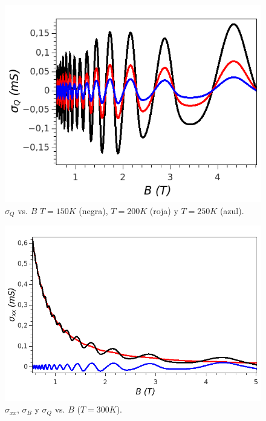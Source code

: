 \begin{frame}
  \begin{figure}[h!]
    \begin{center}
      \includegraphics[scale=0.5]{graficas/fig9.png}
      \caption{$\sigma_{Q}$ vs. $B$ $T = 150 K$ (negra), $T = 200 K$ (roja) y $T = 250 K$ (azul).}
      \label{cont_Cuant}
      \centering
    \end{center}
  \end{figure}
\end{frame}

\begin{frame}
  \begin{figure}[h!]
    \begin{center}
      \includegraphics[scale=0.4]{graficas/fig7.png}
      \caption{$\sigma_{xx}$, $\sigma_{B}$ y $\sigma_{Q}$ vs. $B$ ($T = 300 K$).}
      \label{contrib}
      \centering
    \end{center}
  \end{figure}
\end{frame}


